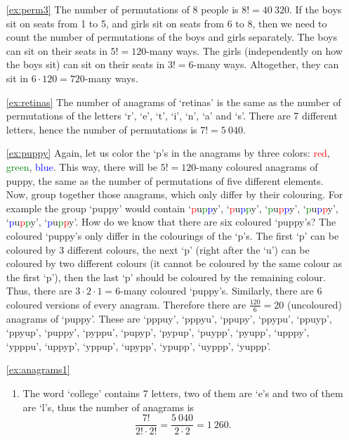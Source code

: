 \begin{enumerate}
\item[\ref{ex:perm3}]
The number of permutations of 8 people is $8! = 40~320$. 
If the boys sit on seats from 1 to 5, 
and girls sit on seats from 6 to 8, 
then we need to count the number of permutations of the boys and girls separately. 
The boys can sit on their seats in $5! = 120$-many ways. 
The girls (independently on how the boys sit) can sit on their seats in $3! = 6$-many ways. 
Altogether, 
they can sit in $6 \cdot 120 = 720$-many ways. 

\item[\ref{ex:retinas}]
The number of anagrams of `retinas' is the same as the number of permutations of the letters `r', `e', `t', `i', `n', `a' and `s'. 
There are 7 different letters, hence the number of permutations is $7! = 5~040$. 

\item[\ref{ex:puppy}]
Again, let us color the `p's in the anagrams by three colors: 
\textcolor{red}{red}, \textcolor{green}{green}, \textcolor{blue}{blue}. 
This way, there will be $5!=120$-many coloured anagrams of puppy, 
the same as the number of permutations of five different elements. 
Now, group together those anagrams, 
which only differ by their colouring. 
For example the group `puppy' would contain 
`\textcolor{red}{p}u\textcolor{green}{p}\textcolor{blue}{p}y', 
`\textcolor{red}{p}u\textcolor{blue}{p}\textcolor{green}{p}y', 
`\textcolor{green}{p}u\textcolor{red}{p}\textcolor{blue}{p}y', 
`\textcolor{green}{p}u\textcolor{blue}{p}\textcolor{red}{p}y', 
`\textcolor{blue}{p}u\textcolor{red}{p}\textcolor{green}{p}y', 
`\textcolor{blue}{p}u\textcolor{green}{p}\textcolor{red}{p}y'. 
How do we know that there are six coloured `puppy's? 
The coloured `puppy's only differ in the colourings of the `p's. 
The first `p' can be coloured by 3 different colours, 
the next `p' (right after the `u') can be coloured by two different colours 
(it cannot be coloured by the same colour as the first `p'), 
then the last `p' should be coloured by the remaining colour. 
Thus, there are $3 \cdot 2 \cdot 1 = 6$-many coloured `puppy's. 
Similarly, there are 6 coloured versions of every anagram. 
Therefore there are $\frac{120}{6} = 20$ (uncoloured) anagrams of `puppy'. 
These are 
`pppuy',
`pppyu',
`ppupy',
`ppypu',
`ppuyp',
`ppyup',
`puppy',
`pyppu',
`pupyp',
`pypup',
`puypp',
`pyupp',
`upppy',
`ypppu',
`uppyp',
`yppup',
`upypp',
`ypupp',
`uyppp',
`yuppp'. 

\item[\ref{ex:anagrams1}]
\begin{enumerate}
\item
The word `college' contains 7 letters, two of them are `e's and two of them are `l's, 
thus the number of anagrams is 
\[
\frac{7!}{2! \cdot 2!} = \frac{5~040}{2 \cdot 2} = 1~260. 
\]


\end{enumerate}
\end{enumerate}
